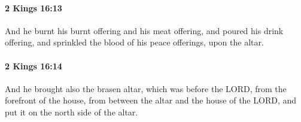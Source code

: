 		\paragraph{2 Kings 16:13} %
			\label{2KINGS-16-13}

			And he burnt his burnt offering and his meat offering, and poured his drink offering, and sprinkled the blood of his peace offerings, upon the altar.


		\paragraph{2 Kings 16:14} %
			\label{2KINGS-16-14}

			And he brought also the brasen altar, which was before the LORD, from the forefront of the house, from between the altar and the house of the LORD, and put it on the north side of the altar.


